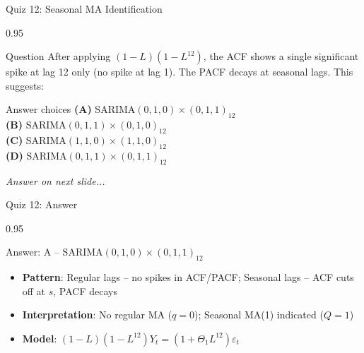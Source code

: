 \documentclass[9pt, aspectratio=169, t]{beamer}
\begin{document}
\begin{frame}{Quiz 12: Seasonal MA Identification}
    \begin{cminipage}{0.95\textwidth}
    \begin{alertblock}{Question}
        After applying $(1-L)(1-L^{12})$, the ACF shows a single significant spike at lag 12 only (no spike at lag 1). The PACF decays at seasonal lags. This suggests:
    \end{alertblock}

    \vspace{0.4cm}

    \begin{block}{Answer choices}
        \textcolor{MainBlue}{\textbf{(A)}} SARIMA$(0,1,0) \times (0,1,1)_{12}$\\[3pt]
        \textcolor{MainBlue}{\textbf{(B)}} SARIMA$(0,1,1) \times (0,1,0)_{12}$\\[3pt]
        \textcolor{MainBlue}{\textbf{(C)}} SARIMA$(1,1,0) \times (1,1,0)_{12}$\\[3pt]
        \textcolor{MainBlue}{\textbf{(D)}} SARIMA$(0,1,1) \times (0,1,1)_{12}$
    \end{block}

    \vspace{0.5cm}

    \begin{center}
        \textit{Answer on next slide...}
    \end{center}
    \end{cminipage}
\end{frame}

\begin{frame}{Quiz 12: Answer}
    \begin{cminipage}{0.95\textwidth}
    \begin{exampleblock}{Answer: A -- SARIMA$(0,1,0) \times (0,1,1)_{12}$}
        \begin{itemize}
            \item \textbf{Pattern}: Regular lags -- no spikes in ACF/PACF; Seasonal lags -- ACF cuts off at $s$, PACF decays
            \item \textbf{Interpretation}: No regular MA ($q = 0$); Seasonal MA(1) indicated ($Q = 1$)
            \item \textbf{Model}: $(1-L)(1-L^{12})Y_t = (1 + \Theta_1 L^{12})\varepsilon_t$
        \end{itemize}
    \end{exampleblock}

    \end{cminipage}
\end{frame}
\end{document}
